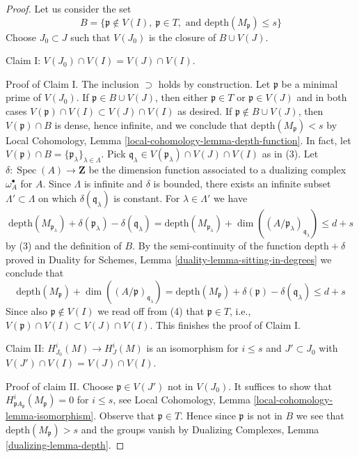 \documentclass[10pt,a4paper]{amsart}
\theoremstyle{plain}
\theoremstyle{definition}
\theoremstyle{remark}
\numberwithin{equation}{subsection}
\def\Spec{\mathop{\mathrm{Spec}}}
\begin{document}
\begin{proof}
Let us consider the set
$$
B = \{\mathfrak p \not \in V(I),\ \mathfrak p \in T,\text{ and }
\text{depth}(M_\mathfrak p) \leq s\}
$$
Choose $J_0 \subset J$ such that $V(J_0)$ is the closure of $B \cup V(J)$.

\medskip\noindent
Claim I: $V(J_0) \cap V(I) = V(J) \cap V(I)$.

\medskip\noindent
Proof of Claim I. The inclusion $\supset$ holds by construction.
Let $\mathfrak p$ be a minimal prime of $V(J_0)$.
If $\mathfrak p \in B \cup V(J)$, then either $\mathfrak p \in T$
or $\mathfrak p \in V(J)$ and in both cases
$V(\mathfrak p) \cap V(I) \subset V(J) \cap V(I)$ as desired.
If $\mathfrak p \not \in B \cup V(J)$, then
$V(\mathfrak p) \cap B$ is dense, hence infinite, and we conclude that
$\text{depth}(M_\mathfrak p) < s$ by
Local Cohomology, Lemma \ref{local-cohomology-lemma-depth-function}.
In fact, let
$V(\mathfrak p) \cap B = \{\mathfrak p_\lambda\}_{\lambda \in \Lambda}$.
Pick $\mathfrak q_\lambda \in V(\mathfrak p_\lambda) \cap V(J) \cap V(I)$
as in (3).
Let $\delta : \Spec(A) \to \mathbf{Z}$ be the dimension function
associated to a dualizing complex $\omega_A^\bullet$ for $A$.
Since $\Lambda$ is infinite and $\delta$ is bounded,
there exists an infinite subset $\Lambda' \subset \Lambda$ on which
$\delta(\mathfrak q_\lambda)$ is constant. For
$\lambda \in \Lambda'$ we have
$$
\text{depth}(M_{\mathfrak p_\lambda}) +
\delta(\mathfrak p_\lambda) - \delta(\mathfrak q_\lambda) =
\text{depth}(M_{\mathfrak p_\lambda}) +
\dim((A/\mathfrak p_\lambda)_{\mathfrak q_\lambda})
\leq d + s
$$
by (3) and the definition of $B$. By the semi-continuity of
the function $\text{depth} + \delta$ proved in
Duality for Schemes, Lemma \ref{duality-lemma-sitting-in-degrees}
we conclude that
$$
\text{depth}(M_\mathfrak p) +
\dim((A/\mathfrak p)_{\mathfrak q_\lambda}) =
\text{depth}(M_\mathfrak p) + \delta(\mathfrak p) - \delta(\mathfrak q_\lambda)
\leq d + s
$$
Since also $\mathfrak p \not \in V(I)$ we read off from (4) that
$\mathfrak p \in T$, i.e.,
$V(\mathfrak p) \cap V(I) \subset V(J) \cap V(I)$. This finishes the
proof of Claim I.

\medskip\noindent
Claim II: $H^i_{J_0}(M) \to H^i_J(M)$ is an isomorphism for $i \leq s$
and $J' \subset J_0$ with $V(J') \cap V(I) = V(J) \cap V(I)$.

\medskip\noindent
Proof of claim II. Choose $\mathfrak p \in V(J')$ not in $V(J_0)$.
It suffices to show that $H^i_{\mathfrak pA_\mathfrak p}(M_\mathfrak p) = 0$
for $i \leq s$, see
Local Cohomology, Lemma \ref{local-cohomology-lemma-isomorphism}.
Observe that $\mathfrak p \in T$. Hence since $\mathfrak p$ is not in $B$
we see that $\text{depth}(M_\mathfrak p) > s$ and the groups vanish by
Dualizing Complexes, Lemma \ref{dualizing-lemma-depth}.


\end{proof}
\end{document}
